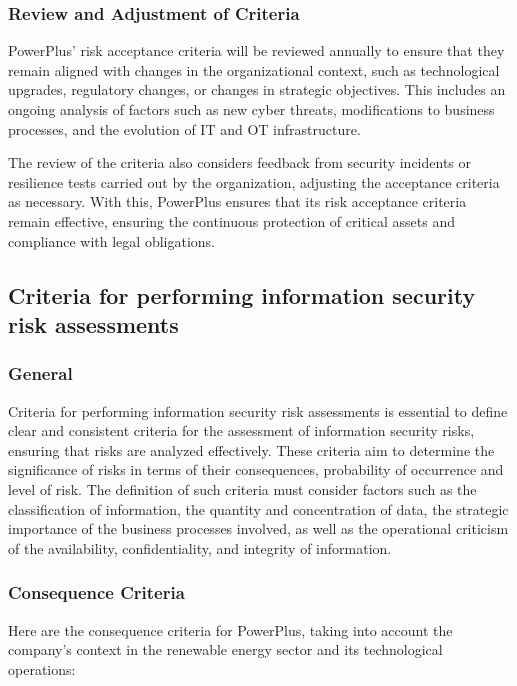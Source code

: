 \subsubsection{Review and Adjustment of Criteria}

PowerPlus' risk acceptance criteria will be reviewed annually to ensure that they remain aligned with changes in the organizational context, such as technological upgrades, regulatory changes, or changes in strategic objectives. This includes an ongoing analysis of factors such as new cyber threats, modifications to business processes, and the evolution of IT and OT infrastructure.

The review of the criteria also considers feedback from security incidents or resilience tests carried out by the organization, adjusting the acceptance criteria as necessary. With this, PowerPlus ensures that its risk acceptance criteria remain effective, ensuring the continuous protection of critical assets and compliance with legal obligations.


\subsection{Criteria for performing information security risk assessments}

\subsubsection{General}

Criteria for performing information security risk assessments is essential to define clear and consistent criteria for the assessment of information security risks, ensuring that risks are analyzed effectively. These criteria aim to determine the significance of risks in terms of their consequences, probability of occurrence and level of risk. The definition of such criteria must consider factors such as the classification of information, the quantity and concentration of data, the strategic importance of the business processes involved, as well as the operational criticism of the availability, confidentiality, and integrity of information.

\subsubsection{Consequence Criteria}

Here are the consequence criteria for PowerPlus, taking into account the company's context in the renewable energy sector and its technological operations:

